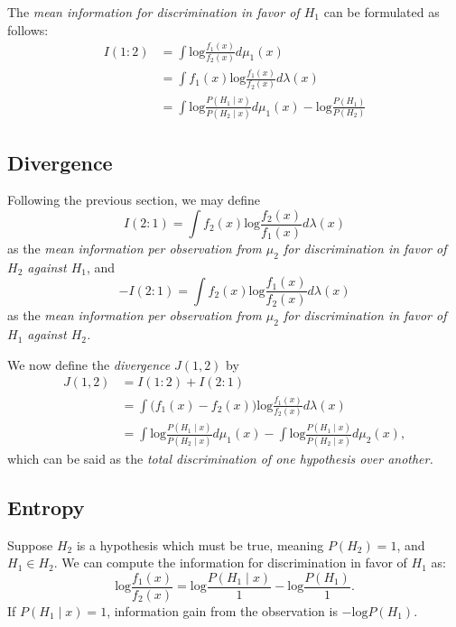 \documentclass[twocolumn]{article}
\theoremstyle{plain}
\begin{document}
The \textit{mean information for discrimination in favor of $H_1$} can be formulated as follows:
\begin{align}
    I(1:2) &= \int{\text{log}\frac{f_1(x)}{f_2(x)}d\mu_1(x)} \\
    &= \int{f_1(x)\text{log}\frac{f_1(x)}{f_2(x)}d\lambda(x)} \\
    &= \int \text{log}\frac{P(H_1 \mid x)}{P(H_2 \mid x)}d\mu_1 (x) - \text{log}\frac{P(H_1)}{P(H_2)}
\end{align}

\subsection{Divergence}

Following the previous section, we may define
\begin{equation}
    I(2:1) = \int f_2(x) \text{log}\frac{f_2(x)}{f_1(x)}d \lambda (x) 
\end{equation}
as the \textit{mean information per observation from $\mu_2$ for discrimination in favor of $H_2$ against $H_1$}, and
\begin{equation}
    -I(2:1) = \int f_2(x) \text{log}\frac{f_1(x)}{f_2(x)}d \lambda (x) 
\end{equation}
as the \textit{mean information per observation from $\mu_2$ for discrimination in favor of $H_1$ against $H_2$.}

We now define the \textit{divergence} $J(1,2)$ by 
\begin{align}
    J(1,2) &= I(1:2) + I(2:1) \\
    &= \int \big(f_1(x) - f_2(x)\big) \text{log}\frac{f_1(x)}{f_2(x)}d \lambda(x) \\
    &= \int \text{log}\frac{P(H_1 \mid x)}{P(H_2 \mid x)}d\mu_1(x) - \int \text{log} \frac{P(H_1\mid x)}{P(H_2 \mid x)} d \mu_2(x),
\end{align}
which can be said as the \textit{total discrimination of one hypothesis over another.}

\subsection{Entropy}

Suppose $H_2$ is a hypothesis which must be true, meaning $P(H_2) = 1$, and $H_1 \in H_2$. We can compute the information for discrimination in favor of $H_1$ as:
\begin{equation}
    \text{log}\frac{f_1(x)}{f_2(x)} = \text{log}\frac{P(H_1 \mid x)}{1} - \text{log}\frac{P(H_1)}{1}.
\end{equation}
If $P(H_1 \mid x) = 1$, information gain from the observation is $-\text{log}P(H_1)$.
\end{document}
